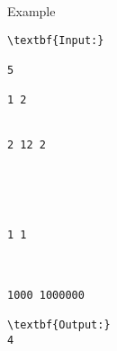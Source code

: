 Example
\begin{verbatim}
\textbf{Input:}

5

1 2


2 12 2





1 1



1000 1000000

\textbf{Output:}
4
\end{verbatim}
